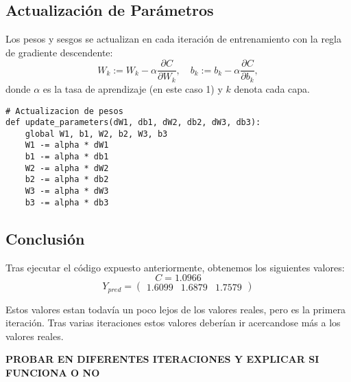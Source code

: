 \documentclass[paper=a4, fontsize=11pt]{scrartcl} %
\numberwithin{equation}{section} %
\numberwithin{figure}{section} %
\numberwithin{table}{section} %
\begin{document}
\subsection{Actualización de Parámetros}

Los pesos y sesgos se actualizan en cada iteración de entrenamiento con la regla de gradiente descendente:
\[
W_k := W_k - \alpha \frac{\partial C}{\partial W_k}, \quad b_k := b_k - \alpha \frac{\partial C}{\partial b_k},
\]
donde $\alpha$ es la tasa de aprendizaje (en este caso 1) y $k$ denota cada capa.

\vspace{2mm}
\begin{lstlisting}
# Actualizacion de pesos
def update_parameters(dW1, db1, dW2, db2, dW3, db3):
    global W1, b1, W2, b2, W3, b3
    W1 -= alpha * dW1
    b1 -= alpha * db1
    W2 -= alpha * dW2
    b2 -= alpha * db2
    W3 -= alpha * dW3
    b3 -= alpha * db3
\end{lstlisting}

\subsection{Conclusión}

Tras ejecutar el código expuesto anteriormente, obtenemos los siguientes valores:
\[
C = 1.0966
\]
\[
Y_{pred} = \begin{pmatrix} 1.6099 & 1.6879 & 1.7579 \end{pmatrix}
\]

Estos valores estan todavía un poco lejos de los valores reales, pero es la primera iteración.  Tras varias iteraciones estos valores deberían ir acercandose más a los valores reales.


\color{red}
\textbf{PROBAR EN DIFERENTES ITERACIONES Y EXPLICAR SI FUNCIONA O NO}
\end{document}
